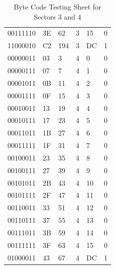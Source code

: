 \documentclass[12pt,a4paper]{report}
\begin{document}
\begin{table}[]
\begin{tabular}{llllll}
00111110                                               & 3E        & 62            & 3      & 15     & 0       \\
11000010                                               & C2        & 194           & 3      & DC     & 1       \\
00000011                                               & 03        & 3             & 4      & 0      & 0       \\
00000111                                               & 07        & 7             & 4      & 1      & 0       \\
00001011                                               & 0B        & 11            & 4      & 2      & 0       \\
00001111                                               & 0F        & 15            & 4      & 3      & 0       \\
00010011                                               & 13        & 19            & 4      & 4      & 0       \\
00010111                                               & 17        & 23            & 4      & 5      & 0       \\
00011011                                               & 1B        & 27            & 4      & 6      & 0       \\
00011111                                               & 1F        & 31            & 4      & 7      & 0       \\
00100011                                               & 23        & 35            & 4      & 8      & 0       \\
00100111                                               & 27        & 39            & 4      & 9      & 0       \\
00101011                                               & 2B        & 43            & 4      & 10     & 0       \\
00101111                                               & 2F        & 47            & 4      & 11     & 0       \\
00110011                                               & 33        & 51            & 4      & 12     & 0       \\
00110111                                               & 37        & 55            & 4      & 13     & 0       \\
00111011                                               & 3B        & 59            & 4      & 14     & 0       \\
00111111                                               & 3F        & 63            & 4      & 15     & 0       \\
01000011                                               & 43        & 67            & 4      & DC     & 1 
\end{tabular}
\caption{Byte Code Testing Sheet for Sectors 3 and 4} %
\label{tab:Testing Table Sectors 3 and 4}   
\end{table}
\end{document}
